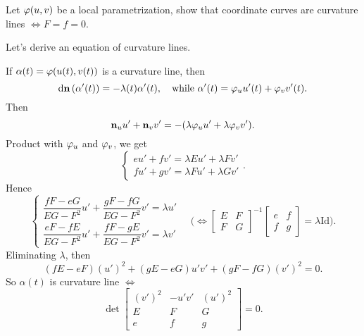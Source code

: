 \begin{exercise}
    Let \(\varphi(u,v)\) be a local parametrization, show that coordinate curves are
    curvature lines \(\iff F=f=0\).
\end{exercise}
\begin{comment}
\begin{proof}
    1. If \(\vphi(u,v_0)\) and \(\vphi(u_0,v)\) are curvature lines, \[
        \begin{cases}
            \dd{\vb{n}}(\vphi_u)=-\lambda\vphi_u \\
            \dd{\vb{n}}(\vphi_v)=-\mu\vphi_v
        \end{cases}
        \text{\ie}\quad\begin{cases}
            \vb{n}_u=-\lambda\vphi_u \\
            \vb{n}_v=-\mu\vphi_v
        \end{cases}
    .\] 
    So \(f=-\lambda F=-\mu F\). \ie\ \((\lambda-\mu)F=0\). If \(\lambda=\mu\),
    then the point is umbilical, it's enough to imply \(F=0\).
    If \(\lambda\neq \mu\), then \(F=0\implies f=0\).
\end{proof}
\end{comment}

Let's derive an equation of curvature lines.

If \(\alpha(t)=\varphi(u(t),v(t))\) is a curvature line, then \[
    \dd{\vb{n}}(\alpha'(t))=-\lambda(t)\alpha'(t),
    \quad \text{while }\alpha'(t)=\varphi_u u'(t)+\varphi_v v'(t)
.\] Then \[
    \vb{n}_u u'+\vb{n}_v v'=-(\lambda \varphi_u u'+\lambda\varphi_v v')
.\] Product with \(\varphi_u\) and \(\varphi_v\), we get \[
    \begin{cases}
        eu'+fv'=\lambda Eu'+\lambda Fv' \\
        fu' +gv'=\lambda Fu'+\lambda Gv'
    \end{cases}
.\] Hence \[
    \begin{cases}
        \dfrac{fF-eG}{EG-F^2}u'+\dfrac{gF-fG}{EG-F^2}v'=\lambda u' \\
        \dfrac{eF-fE}{EG-F^2}u'+\dfrac{fF-gE}{EG-F^2}v'=\lambda v'
    \end{cases}
    \quad \bigl(\iff \begin{bmatrix}
        E & F \\ F & G
    \end{bmatrix}^{-1}\begin{bmatrix}
        e & f \\ f & g
    \end{bmatrix}=\lambda \mathrm{Id}\bigr)
.\] Eliminating \(\lambda\), then \[
    (fE-eF)(u')^2+(gE-eG)u'v'+(gF-fG)(v')^2=0
.\] So \(\alpha(t)\) is curvature line \(\iff \) \[
    \det\begin{bmatrix}
        (v')^2 & -u'v' & (u')^2 \\
        E & F & G \\
        e & f & g
    \end{bmatrix}=0
.\] 

